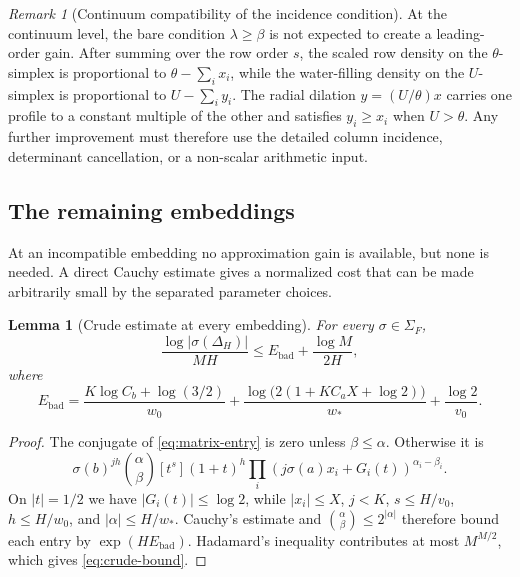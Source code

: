 \documentclass[11pt]{article}
\newtheorem{lemma}[theorem]{Lemma}
\theoremstyle{definition}
\theoremstyle{remark}
\newtheorem{remark}[theorem]{Remark}
\numberwithin{equation}{section}
\begin{document}
\begin{remark}[Continuum compatibility of the incidence condition]
At the continuum level, the bare condition $\lambda\ge\beta$ is not
expected to create a leading-order gain.  After summing over the row
order $s$, the scaled row density on the $\theta$-simplex is proportional
to $\theta-\sum_i x_i$, while the water-filling density on the
$U$-simplex is proportional to $U-\sum_i y_i$.  The radial dilation
$y=(U/\theta)x$ carries one profile to a constant multiple of the other
and satisfies $y_i\ge x_i$ when $U>\theta$.  Any further improvement
must therefore use the detailed column incidence, determinant
cancellation, or a non-scalar arithmetic input.
\end{remark}

\subsection{The remaining embeddings}

At an incompatible embedding no approximation gain is available, but
none is needed.  A direct Cauchy estimate gives a normalized cost that
can be made arbitrarily small by the separated parameter choices.

\begin{lemma}[Crude estimate at every embedding]\label{lem:crude}
For every $\sigma\in\Sigma_F$,
\begin{equation}\label{eq:crude-bound}
 \frac{\log|\sigma(\Delta_H)|}{MH}
 \le E_{\mathrm{bad}}+\frac{\log M}{2H},
\end{equation}
where
\begin{equation}\label{eq:Ebad}
 E_{\mathrm{bad}}
 =\frac{K\log C_b+\log(3/2)}{w_0}
 +\frac{\log\bigl(2(1+KC_aX+\log2)\bigr)}{w_*}
 +\frac{\log2}{v_0}.
\end{equation}
\end{lemma}

\begin{proof}
The conjugate of \eqref{eq:matrix-entry} is zero unless
$\beta\le\alpha$.  Otherwise it is
\[
 \sigma(b)^{jh}\binom\alpha\beta[t^s](1+t)^h
 \prod_i(j\sigma(a)x_i+G_i(t))^{\alpha_i-\beta_i}.
\]
On $|t|=1/2$ we have $|G_i(t)|\le\log2$, while
$|x_i|\le X$, $j<K$, $s\le H/v_0$, $h\le H/w_0$, and
$|\alpha|\le H/w_*$.  Cauchy's estimate and
$\binom\alpha\beta\le2^{|\alpha|}$ therefore bound each entry by
$\exp(HE_{\mathrm{bad}})$.  Hadamard's inequality contributes at most
$M^{M/2}$, which gives \eqref{eq:crude-bound}.
\end{proof}
\end{document}
